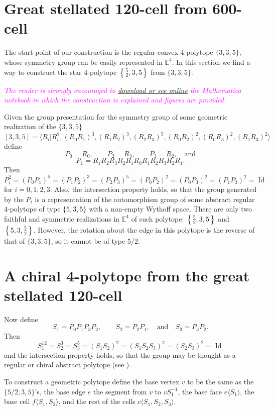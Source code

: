 \documentclass[spanish]{article}
\theoremstyle{definition}
\newcommand{\E}{\mathbb{E}}
\DeclareMathOperator{\Id}{Id}
\begin{document}
	\section{Great stellated 120-cell from 600-cell}
	The start-point of our construction is the regular convex 4-polytope $\{3,3,5\}$, whose symmetry group can be easily represented in $\E^4$.  In this section we find a way to construct the star 4-polytope $\left\{\frac{5}{2},3,5\right\}$ from $\{3,3,5\}$.
	
	\textcolor{magenta}{\textit{The reader is strongly encouraged to \href{https://www.wolframcloud.com/obj/dangcasanova/Published/chiral-4polytope.nb}{download or see online} the Mathematica notebook in which the construction is explained and figures are provided.}}
	
	Given the group presentation for the symmetry group of some geometric realization of the $\{3,3,5\}$
		\[[3,3,5]=\langle R_i|R_i^2,(R_0R_1)^3,(R_1R_2)^3,(R_2R_3)^5,(R_0R_2)^2,(R_0R_3)^2,(R_1R_3)^2\rangle\]
	define
		\[P_0=R_0,\qquad P_2=R_3,\qquad P_3=R_2,\quad\text{and}\]
		\[P_1=R_1R_2R_3R_2R_1R_0R_1R_2R_3R_2R_1.\]
	Then
		\[ P_i^2=(P_0P_1)^5=(P_1P_2)^3=(P_2P_3)^5=(P_0P_2)^2=(P_0P_3)^2=(P_1P_3)^2=\Id\]
	for $i=0,1,2,3$.
	Also, the intersection property holds, so that the group generated by the $P_i$ is a representation of the automorphism group of some abstract regular 4-polytope of type $\{5,3,5\}$ with a non-empty Wythoff space. There are only two faithful and symmetric realizations in $\mathbb{E}^4$ of such polytope: $\left\{\frac{5}{2},3,5\right\}$ and $\left\{5,3,\frac{5}{2}\right\}$. However, the rotation about the edge in this polytope is the reverse of that of $\{3,3,5\}$, so it cannot be of type 5/2.
	

	\section{A chiral 4-polytope from the great stellated 120-cell}
	Now define
		\[S_1=P_0P_1P_3P_2,\qquad S_2=P_2P_1,\quad\text{and}\quad S_3=P_3P_2.\]
	Then
		\[S_1^{12}=S_2^3=S_3^5=(S_1S_2)^2=(S_1S_2S_3)^2=(S_2S_3)^2=\Id\]
	and the intersection property holds, so that the group may be thought as a regular or chiral abstract polytope (see \cite{schulte-chiral}).
	
	To construct a geometric polytope define the base vertex $v$ to be the same as the $\{5/2,3,5\}$'s, the base edge $e$ the segment from $v$ to $vS_1^{-1}$, the base face $e\langle S_1\rangle$, the base cell $f\langle S_1,S_2\rangle$, and the rest of the cells $c\langle S_1,S_2,S_3\rangle$.
	
\end{document}
